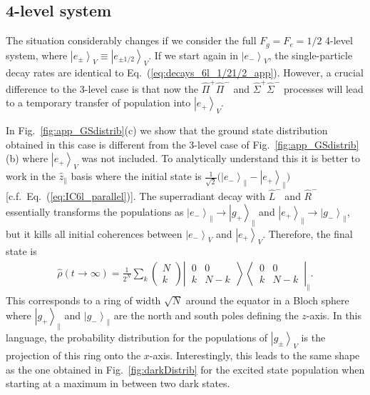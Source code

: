 \documentclass[aps,prx,superscriptaddress,twocolumn,notitlepage,nofootinbib,longbibliography]{revtex4-2}
\newcommand{\ket}[1]{\left|#1\right>}
\newcommand{\quv}{\hat{z}}
\begin{document}

\subsection{4-level system}

The situation considerably changes if we consider the full $F_g=F_e=1/2$ 4-level system, where $\ket{e_\pm}_V\equiv \ket{e_{\pm1/2}}_V$. If we start again in $\ket{e_-}_V$, the single-particle decay rates are identical to Eq.~(\ref{eq:decays_6l_1/21/2_app}). However, a crucial difference to the 3-level case is that now the $\hat{\Pi}^+\hat{\Pi}^-$ and $\hat{\Sigma}^+\hat{\Sigma}^-$ processes will lead to a temporary transfer of population into $\ket{e_+}_V$.

In Fig.~\ref{fig:app_GSdistrib}(c) we show that the ground state distribution obtained in this case is different from the 3-level case of Fig.~\ref{fig:app_GSdistrib}(b) where $\ket{e_+}_V$ was not included. To analytically understand this it is better to work in the $\quv_\parallel$ basis where the initial state is $\frac{1}{\sqrt{2}} \big( \ket{e_{-}}_\parallel - \ket{e_{+}}_\parallel \big)$ [c.f.~Eq.~(\ref{eq:IC6l_parallel})]. The superradiant decay with $\hat{L}^-$ and $\hat{R}^-$ essentially transforms the populations as $\ket{e_{-}}_\parallel \rightarrow \ket{g_{+}}_\parallel$ and $\ket{e_{+}}_\parallel \rightarrow \ket{g_{-}}_\parallel$, but it kills all initial coherences between $\ket{e_-}_V$ and $\ket{e_+}_V$. Therefore, the final state is
\begin{align}
	\hat\rho(t\rightarrow \infty) = \frac{1}{2^N} \sum_k \begin{pmatrix} N \\ k \end{pmatrix} \left|\, \begin{smallmatrix} 0 & 0 \\  k & N-k  \end{smallmatrix} \,\right\rangle \left\langle\, \begin{smallmatrix} 0 & 0 \\  k & N-k  \end{smallmatrix} \,\right|_\parallel .
\end{align}
This corresponds to a ring of width $\sqrt{N}$ around the equator in a Bloch sphere where $\ket{g_{+}}_\parallel$ and $\ket{g_{-}}_\parallel$ are the north and south poles defining the $z$-axis. In this language, the probability distribution for the populations of $\ket{g_{\pm}}_V$ is the projection of this ring onto the $x$-axis. Interestingly, this leads to the same shape as the one obtained in Fig.~\ref{fig:darkDistrib} for the excited state population when starting at a maximum in between two dark states.
\end{document}
